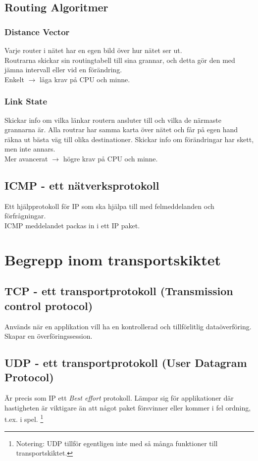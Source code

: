 \documentclass[11pt]{article}
\begin{document}
\subsection{Routing Algoritmer}
\subsubsection{Distance Vector}
Varje router i nätet har en egen bild över hur nätet ser ut. \\
Routrarna skickar sin routingtabell till sina grannar, och detta gör den med jämna intervall eller vid en förändring. \\
Enkelt $\rightarrow$ låga krav på CPU och minne.
\subsubsection{Link State}
Skickar info om vilka länkar routern ansluter till och vilka de närmaste grannarna är. Alla routrar har samma karta över nätet och får på egen hand räkna ut bästa väg till olika destinationer. Skickar info om förändringar har skett, men inte annars. \\
Mer avancerat $\rightarrow$ högre krav på CPU och minne.
\subsection{ICMP - ett nätverksprotokoll}
Ett hjälpprotokoll för IP som ska hjälpa till med felmeddelanden och förfrågningar. \\
ICMP meddelandet packas in i ett IP paket. 
\section{Begrepp inom transportskiktet}
\subsection{TCP - ett transportprotokoll (Transmission control protocol)}
Används när en applikation vill ha en kontrollerad och tillförlitlig dataöverföring. Skapar en överföringssession.
\subsection{UDP - ett transportprotokoll (User Datagram Protocol)}
Är precis som IP ett \emph{Best effort} protokoll. Lämpar sig för applikationer där hastigheten är viktigare än att något paket försvinner eller kommer i fel ordning, t.ex. i spel. \footnote{Notering: UDP tillför egentligen inte med så många funktioner till transportskiktet.}
\end{document}
